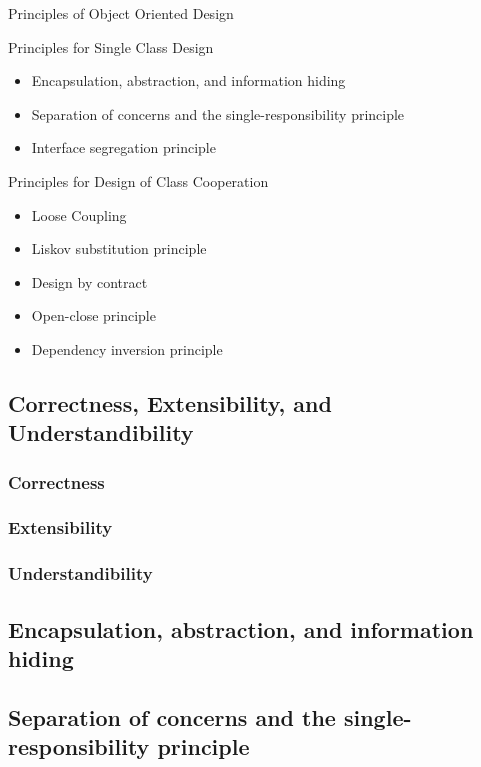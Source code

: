 \begin{frame}{Principles of Object Oriented Design}
   \begin{block}{Principles for Single Class Design}
       \begin{itemize}
           \item Encapsulation, abstraction, and information hiding
           \item Separation of concerns and the single-responsibility principle
           \item Interface segregation principle
   \end{itemize}
   \end{block}
   \begin{block}{Principles for Design of Class Cooperation}
       \begin{itemize}
           \item Loose Coupling
           \item Liskov substitution principle
           \item Design by contract
           \item Open-close principle
           \item Dependency inversion principle
   \end{itemize}
\end{block}


\end{frame}

\subsection{Correctness, Extensibility, and Understandibility}
\subsubsection{Correctness}
\subsubsection{Extensibility}
\subsubsection{Understandibility}

\subsection{Encapsulation, abstraction, and information hiding}
\subsection{Separation of concerns and the single-responsibility principle}
